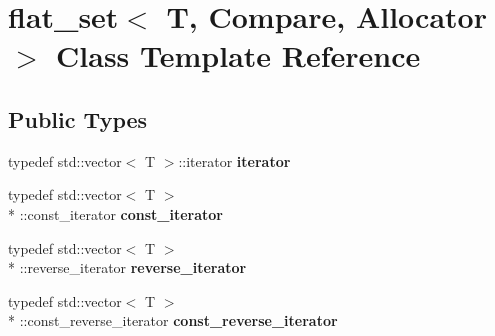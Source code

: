 \hypertarget{classflat__set}{\section{flat\+\_\+set$<$ T, Compare, Allocator $>$ Class Template Reference}
\label{classflat__set}
}
\subsection*{Public Types}
\begin{DoxyCompactItemize}
\item 
\hypertarget{classflat__set_a32ab9f38f230df82e9c3ca4b0e833419}{typedef std\+::vector$<$ T $>$\+::iterator {\bfseries iterator}}\label{classflat__set_a32ab9f38f230df82e9c3ca4b0e833419}

\item 
\hypertarget{classflat__set_a2bbb78ab23ff89845c14ecb418485d47}{typedef std\+::vector$<$ T $>$\\*
\+::const\+\_\+iterator {\bfseries const\+\_\+iterator}}\label{classflat__set_a2bbb78ab23ff89845c14ecb418485d47}

\item 
\hypertarget{classflat__set_acd5fb908d5f63906824e8dc85ad948bb}{typedef std\+::vector$<$ T $>$\\*
\+::reverse\+\_\+iterator {\bfseries reverse\+\_\+iterator}}\label{classflat__set_acd5fb908d5f63906824e8dc85ad948bb}

\item 
\hypertarget{classflat__set_a2489a867ea00fbfff1c8ddf510d2d75a}{typedef std\+::vector$<$ T $>$\\*
\+::const\+\_\+reverse\+\_\+iterator {\bfseries const\+\_\+reverse\+\_\+iterator}}\label{classflat__set_a2489a867ea00fbfff1c8ddf510d2d75a}

\end{DoxyCompactItemize}
